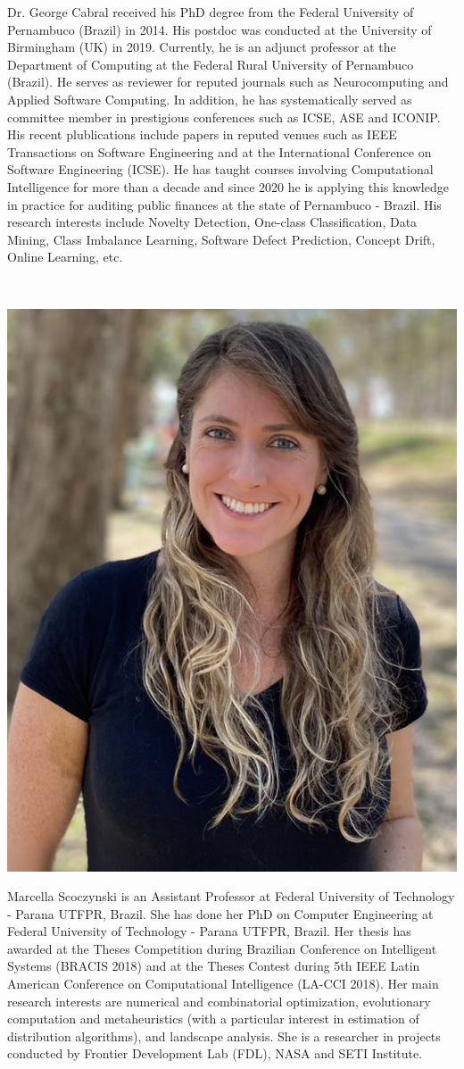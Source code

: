Dr. George Cabral received his PhD degree from the Federal University of Pernambuco (Brazil) in 2014. His postdoc was conducted at the University of Birmingham (UK) in 2019. Currently, he is an adjunct professor at the Department of Computing at the Federal Rural University of Pernambuco (Brazil). He serves as reviewer for reputed journals such as Neurocomputing and Applied Software Computing. In addition, he has systematically served as committee member in prestigious conferences such as ICSE, ASE and ICONIP. His recent plublications include papers in reputed venues such as IEEE Transactions on Software Engineering and at the International Conference on Software Engineering (ICSE). He has taught courses involving Computational Intelligence for more than a decade and since 2020 he is applying this knowledge in practice for auditing public finances at the state of Pernambuco - Brazil. His research interests include Novelty Detection, One-class Classification, Data Mining, Class Imbalance Learning, Software Defect Prediction, Concept Drift, Online Learning, etc.

\newpage

\

\vspace{3cm}
\begin{center}
\includegraphics[width=.3\textwidth]{Photos/mar2022.jpg}
\end{center}

Marcella Scoczynski is an Assistant Professor at Federal University of Technology - Parana UTFPR, Brazil. She has done her PhD on Computer Engineering at Federal University of Technology - Parana UTFPR, Brazil. Her thesis has awarded at the Theses Competition during Brazilian Conference on Intelligent Systems (BRACIS 2018) and at the Theses Contest during 5th IEEE Latin American Conference on Computational Intelligence (LA-CCI 2018). Her main research interests are numerical and combinatorial optimization, evolutionary computation and metaheuristics (with a particular interest in estimation of distribution algorithms), and landscape analysis. She is a researcher in projects conducted by Frontier Development Lab (FDL), NASA and SETI Institute. 

